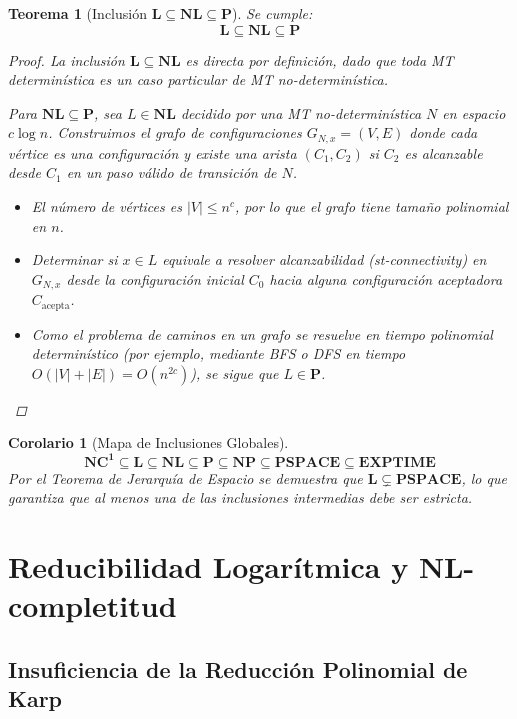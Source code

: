 \documentclass[11pt, a4paper]{article}
\theoremstyle{definition}
\theoremstyle{plain}
\newtheorem{teorema}[definicion]{Teorema}
\newtheorem{corolario}[definicion]{Corolario}
\theoremstyle{remark}
\newcommand{\classL}{\mathbf{L}}
\newcommand{\classNL}{\mathbf{NL}}
\newcommand{\classP}{\mathbf{P}}
\newcommand{\classPSPACE}{\mathbf{PSPACE}}
\begin{document}
\begin{teorema}[Inclusión \texorpdfstring{$\classL \subseteq \classNL \subseteq \classP$}{L en NL en P}]
Se cumple:
\[
\classL \subseteq \classNL \subseteq \classP
\]
\begin{proof}
La inclusión $\classL \subseteq \classNL$ es directa por definición, dado que toda MT determinística es un caso particular de MT no-determinística.

Para $\classNL \subseteq \classP$, sea $L \in \classNL$ decidido por una MT no-determinística $N$ en espacio $c \log n$. Construimos el grafo de configuraciones $G_{N,x} = (V, E)$ donde cada vértice es una configuración y existe una arista $(C_1, C_2)$ si $C_2$ es alcanzable desde $C_1$ en un paso válido de transición de $N$. 
\begin{itemize}
    \item El número de vértices es $|V| \le n^c$, por lo que el grafo tiene tamaño polinomial en $n$.
    \item Determinar si $x \in L$ equivale a resolver alcanzabilidad (\textit{st-connectivity}) en $G_{N,x}$ desde la configuración inicial $C_0$ hacia alguna configuración aceptadora $C_{\text{acepta}}$.
    \item Como el problema de caminos en un grafo se resuelve en tiempo polinomial determinístico (por ejemplo, mediante BFS o DFS en tiempo $O(|V| + |E|) = O(n^{2c})$), se sigue que $L \in \classP$.
\end{itemize}
\end{proof}
\end{teorema}

\begin{corolario}[Mapa de Inclusiones Globales]
\[
\mathbf{NC^1 \subseteq L \subseteq NL \subseteq P \subseteq NP \subseteq PSPACE \subseteq EXPTIME}
\]
Por el Teorema de Jerarquía de Espacio se demuestra que $\classL \subsetneq \classPSPACE$, lo que garantiza que al menos una de las inclusiones intermedias debe ser estricta.
\end{corolario}

\section{Reducibilidad Logarítmica y \texorpdfstring{$\classNL$}{NL}-completitud}

\subsection{Insuficiencia de la Reducción Polinomial de Karp}
\end{document}
